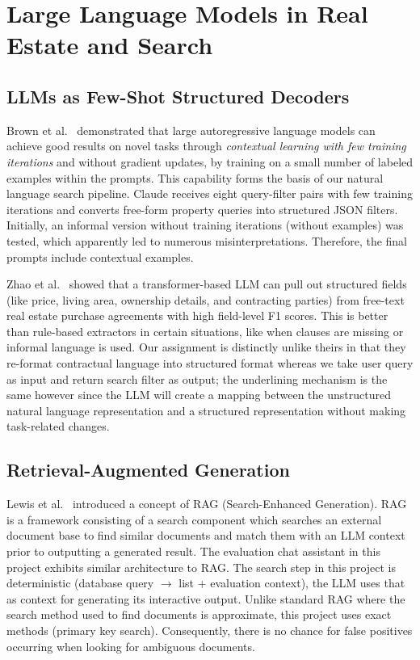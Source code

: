 \section{Large Language Models in Real Estate and Search}

\subsection{LLMs as Few-Shot Structured Decoders}

Brown et al.~\cite{brown2020language} demonstrated that large autoregressive 
language models can achieve good results on novel tasks through 
\textit{contextual learning with few training iterations} and without gradient 
updates, by training on a small number of labeled examples within the prompts. 
This capability forms the basis of our natural language search pipeline. 
Claude receives eight query-filter pairs with few training iterations and 
converts free-form property queries into structured JSON filters. Initially, 
an informal version without training iterations (without examples) was tested, 
which apparently led to numerous misinterpretations. Therefore, the final 
prompts include contextual examples.

Zhao et al.~\cite{zhao2024llm} showed that a transformer-based LLM can pull out 
structured fields (like price, living area, ownership details, and contracting 
parties) from free-text real estate purchase agreements with high field-level F1 
scores. This is better than rule-based extractors in certain situations, like 
when clauses are missing or informal language is used. Our assignment is distinctly unlike theirs in that they re-format contractual 
language into structured format whereas we take user query as input and return 
search filter as output; the underlining mechanism is the same however since 
the LLM will create a mapping between the unstructured natural language 
representation and a structured representation without making task-related 
changes.

\subsection{Retrieval-Augmented Generation}

Lewis et al.~\cite{lewis2020retrieval} introduced a concept of RAG 
(Search-Enhanced Generation). RAG is a framework consisting of a search 
component which searches an external document base to find similar documents 
and match them with an LLM context prior to outputting a generated result. The 
evaluation chat assistant in this project exhibits similar architecture to RAG. 
The search step in this project is deterministic (database query $\to$ list + 
evaluation context), the LLM uses that as context for generating its 
interactive output. Unlike standard RAG where the search method used to find 
documents is approximate, this project uses exact methods (primary key 
search). Consequently, there is no chance for false positives occurring when 
looking for ambiguous documents.

